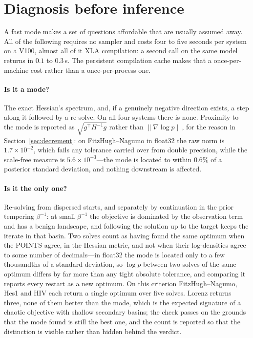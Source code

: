 \documentclass[11pt]{article}
\theoremstyle{plain}
\theoremstyle{definition}
\theoremstyle{remark}
\begin{document}
\section{Diagnosis before inference}
\label{sec:diagnosis}

A fast mode makes a set of questions affordable that are usually assumed away. All of the following
requires no sampler and costs four to five seconds per system on a V100, almost all of it XLA
compilation: a second call on the same model returns in $0.1$ to $0.3$\,s. The persistent
compilation cache makes that a once-per-machine cost rather than a once-per-process one.

\paragraph{Is it a mode?} The exact Hessian's spectrum, and, if a genuinely negative direction
exists, a step along it followed by a re-solve. On all four systems there is none. Proximity to the
mode is reported as $\sqrt{g^\top H^{-1} g}$ rather than $\|\nabla\log p\|$, for the reason in
Section~\ref{sec:decrement}: on FitzHugh--Nagumo in float32 the raw norm is $1.7\times10^{-2}$,
which fails any tolerance carried over from double precision, while the scale-free measure is
$5.6\times10^{-3}$---the mode is located to within $0.6\%$ of a posterior standard deviation, and
nothing downstream is affected.

\paragraph{Is it the only one?} Re-solving from dispersed starts, and separately by continuation in
the prior tempering $\beta^{-1}$: at small $\beta^{-1}$ the objective is dominated by the
observation term and has a benign landscape, and following the solution up to the target keeps the
iterate in that basin. Two solves count as having found the same optimum when the POINTS agree, in
the Hessian metric, and not when their log-densities agree to some number of decimals---in float32
the mode is located only to a few thousandths of a standard deviation, so $\log p$ between two
solves of the same optimum differs by far more than any tight absolute tolerance, and comparing it
reports every restart as a new optimum. On this criterion FitzHugh--Nagumo, Hes1 and HIV each
return a single optimum over five solves. Lorenz returns three, none of them better than the mode,
which is the expected signature of a chaotic objective with shallow secondary basins; the check
passes on the grounds that the mode found is still the best one, and the count is reported so that
the distinction is visible rather than hidden behind the verdict.
\end{document}
